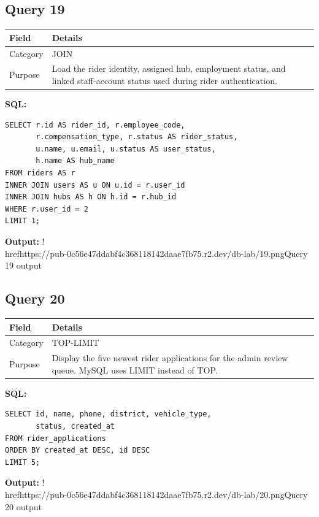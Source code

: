 \documentclass[11pt,a4paper]{article}
\begin{document}
\subsection{Query 19}
\begin{tabularx}{\linewidth}{>{\raggedright\arraybackslash}X|>{\raggedright\arraybackslash}X}
\hline
\textbf{Field} & \textbf{Details} \\ 
\hline
Category & JOIN \\ 
\hline
Purpose & Load the rider identity, assigned hub, employment status, and linked staff-account status used during rider authentication. \\ 
\hline
\end{tabularx}
\textbf{SQL:}
\begin{lstlisting}
SELECT r.id AS rider_id, r.employee_code,
       r.compensation_type, r.status AS rider_status,
       u.name, u.email, u.status AS user_status,
       h.name AS hub_name
FROM riders AS r
INNER JOIN users AS u ON u.id = r.user_id
INNER JOIN hubs AS h ON h.id = r.hub_id
WHERE r.user_id = 2
LIMIT 1;
\end{lstlisting}
\textbf{Output:}
!\\href{https://pub-0c56e47ddabf4c368118142daae7fb75.r2.dev/db-lab/19.png}{Query 19 output}
\subsection{Query 20}
\begin{tabularx}{\linewidth}{>{\raggedright\arraybackslash}X|>{\raggedright\arraybackslash}X}
\hline
\textbf{Field} & \textbf{Details} \\ 
\hline
Category & TOP-LIMIT \\ 
\hline
Purpose & Display the five newest rider applications for the admin review queue. MySQL uses LIMIT instead of TOP. \\ 
\hline
\end{tabularx}
\textbf{SQL:}
\begin{lstlisting}
SELECT id, name, phone, district, vehicle_type,
       status, created_at
FROM rider_applications
ORDER BY created_at DESC, id DESC
LIMIT 5;
\end{lstlisting}
\textbf{Output:}
!\\href{https://pub-0c56e47ddabf4c368118142daae7fb75.r2.dev/db-lab/20.png}{Query 20 output}
\end{document}
